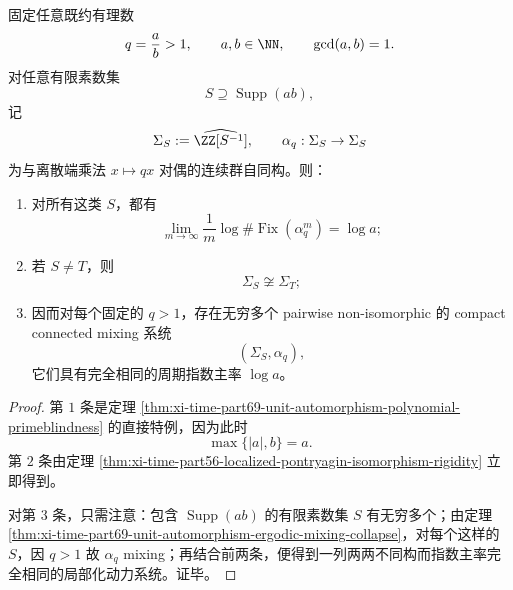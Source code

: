 \begin{corollary}\label{cor:xi-time-part69-same-exponential-rate-infinite-mixing-family}
固定任意既约有理数
\[
q=\frac{a}{b}>1,
\qquad
a,b\in\NN,
\qquad
\gcd(a,b)=1.
\]
对任意有限素数集
\[
S\supseteq \operatorname{Supp}(ab),
\]
记
\[
\Sigma_S:=\widehat{\ZZ[S^{-1}]},
\qquad
\alpha_q:\Sigma_S\to\Sigma_S
\]
为与离散端乘法 \(x\mapsto qx\) 对偶的连续群自同构。则：
\begin{enumerate}
  \item 对所有这类 \(S\)，都有
  \[
  \lim_{m\to\infty}\frac1m\log \#\operatorname{Fix}(\alpha_q^m)=\log a;
  \]
  \item 若 \(S\neq T\)，则
  \[
  \Sigma_S\not\cong \Sigma_T;
  \]
  \item 因而对每个固定的 \(q>1\)，存在无穷多个 pairwise non-isomorphic 的 compact connected mixing 系统
  \[
  (\Sigma_S,\alpha_q),
  \]
  它们具有完全相同的周期指数主率 \(\log a\)。
\end{enumerate}
\end{corollary}
\begin{proof}
第 \(1\) 条是定理 \ref{thm:xi-time-part69-unit-automorphism-polynomial-primeblindness} 的直接特例，因为此时
\[
\max\{|a|,b\}=a.
\]
第 \(2\) 条由定理 \ref{thm:xi-time-part56-localized-pontryagin-isomorphism-rigidity} 立即得到。

对第 \(3\) 条，只需注意：包含 \(\operatorname{Supp}(ab)\) 的有限素数集 \(S\) 有无穷多个；由定理 \ref{thm:xi-time-part69-unit-automorphism-ergodic-mixing-collapse}，对每个这样的 \(S\)，因 \(q>1\) 故 \(\alpha_q\) mixing；再结合前两条，便得到一列两两不同构而指数主率完全相同的局部化动力系统。证毕。
\end{proof}

\endinput
